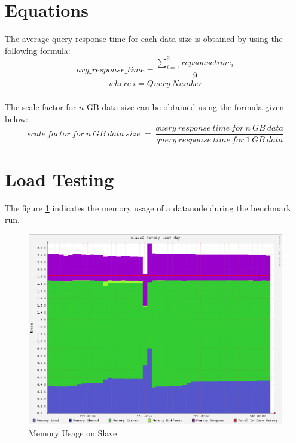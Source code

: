 \documentclass[12pt]{book}
\begin{document}
\section{Equations}
The average query response time for each data size is obtained by using the following formula:
\\\noindent
\begin{equation}
 avg\_response\_time =  \frac{\sum _{i=1}^{9}repsonsetime_{i}}{9}
\end{equation}
\begin{eqnarray*}
 where \ i = Query\ Number
\end{eqnarray*}
\\\noindent
The scale factor for $n$ GB data size can be obtained using the formula given below:
\begin{equation}
scale\ factor\ for\ n\ GB\ data\ size\ =\ \frac{query\ response\ time\ for\ n\ GB\ data}{query\ response\ time\ for\ 1\ GB\ data}
\end{equation}

\section{Load Testing}
The figure \ref{slavemem} indicates the memory usage of a datanode during the benchmark run.

\begin{figure}[!hbt]
 \centering
 \includegraphics[width=15cm]{slave2memfinal.png}
\caption{Memory Usage on Slave \label{slavemem}}
\end{figure}
\end{document}
